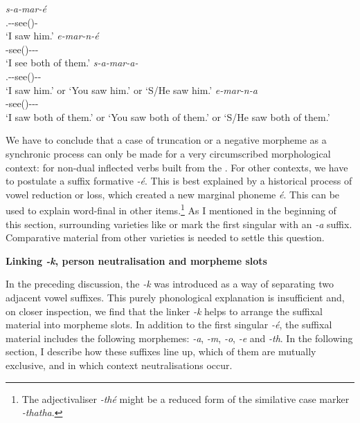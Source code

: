 \begin{exe}
\ex
\begin{xlist}
	\ex
	\gll \emph{s-a-mar-é}\\
	\Tsg.\Masc-\Ndu-see(\Rs)-\Fnsg\\
	\trans `I saw him.'
	\label{ex207}
	\ex
	\gll \emph{e-mar-n-é}\\
	\Stnsg-see(\Ext)-\Ndu-\Pst-\Sg\\
	\trans `I see both of them.'
	\label{ex206}
	\ex
	\gll \emph{s-a-mar-a-\Zero{}}\\
	\Tsg.\Masc-\Ndu-see(\Rs)-\Pst-\Sg\\
	\trans `I saw him.' or `You saw him.' or `S/He saw him.'
	\label{ex208}
	\ex
	\gll \emph{e-mar-n-a}\\
	\Stnsg-see(\Ext)-\Ndu-\Pst-\Sg\\
	\trans `I saw both of them.' or `You saw both of them.' or `S/He saw both of them.'
	\label{ex209}
\end{xlist}
\end{exe}

We have to conclude that a case of truncation or a negative morpheme as a synchronic process can only be made for a very circumscribed morphological context: for non-dual inflected verbs built from the . For other contexts, we have to postulate a suffix formative \emph{-é}. This is best explained by a historical process of vowel reduction or  loss, which created a new marginal phoneme \emph{é}. This can be used to explain word-final  in other items.\footnote{The adjectivaliser \emph{-thé} might be a reduced form of the similative case marker \emph{-thatha}.} As I mentioned in the beginning of this section, surrounding varieties like  or  mark the first  singular with an \emph{-a} suffix. Comparative material from other  varieties is needed to settle this question.%

\noindent
\textbf{Linking \emph{-k}, person neutralisation and morpheme slots}%

In the preceding discussion, the  \emph{-k} was introduced as a way of separating two adjacent vowel suffixes. This purely phonological explanation is insufficient and, on closer inspection, we find that the linker \emph{-k} helps to arrange the suffixal material into morpheme slots. In addition to the first singular \emph{-é}, the suffixal material includes the following morphemes:  \emph{-a},  \emph{-m},  \emph{-o}, \Fnsg{} \emph{-e} and \Stnsg{} \emph{-th}. In the following section, I describe how these suffixes line up, which of them are mutually exclusive, and in which context  neutralisations occur.%

